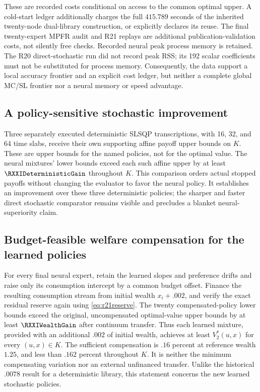 These are recorded costs conditional on access to the common optimal upper. A cold-start ledger additionally charges the full $415.789$ seconds of the inherited twenty-node dual-library construction, or explicitly declares its reuse. The final twenty-expert MPFR audit and R21 replays are additional publication-validation costs, not silently free checks. Recorded neural peak process memory is retained. The R20 direct-stochastic run did not record peak RSS; its 192 scalar coefficients must not be substituted for process memory. Consequently, the data support a local accuracy frontier and an explicit cost ledger, but neither a complete global MC/SL frontier nor a neural memory or speed advantage.

\subsection{A policy-sensitive stochastic improvement}
Three separately executed deterministic SLSQP transcriptions, with 16, 32, and 64 time slabs, receive their own supporting affine payoff upper bounds on $K$. These are upper bounds for the named policies, not for the optimal value. The neural mixtures' lower bounds exceed each such affine upper by at least $\RXXIDeterministicGain$ throughout $K$. This comparison orders actual stopped payoffs without changing the evaluator to favor the neural policy. It establishes an improvement over these three deterministic policies; the sharper and faster direct stochastic comparator remains visible and precludes a blanket neural-superiority claim.

\subsection{Budget-feasible welfare compensation for the learned policies}
For every final neural expert, retain the learned slopes and preference drifts and raise only its consumption intercept by a common budget offset. Finance the resulting consumption stream from initial wealth $x_i+.002$, and verify the exact residual reserve again using \eqref{eq:r21reserve}. The twenty compensated-policy lower bounds exceed the original, uncompensated optimal-value upper bounds by at least $\RXXIWealthGain$ after continuum transfer. Thus each learned mixture, provided with an additional $.002$ of initial wealth, achieves at least $V_2^*(u,x)$ for every $(u,x)\in K$. The sufficient compensation is $.16$ percent at reference wealth $1.25$, and less than $.162$ percent throughout $K$. It is neither the minimum compensating variation nor an external unfinanced transfer. Unlike the historical $.0078$ result for a deterministic library, this statement concerns the new learned stochastic policies.

